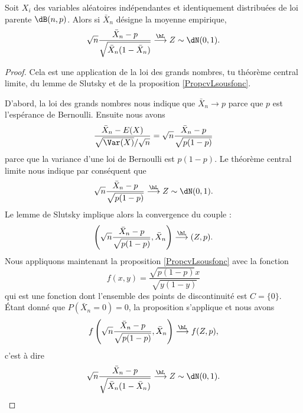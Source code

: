 \begin{proposition}     \label{PropLimxBNpxbxbsqrt}
    Soit \( X_i\) des variables aléatoires indépendantes et identiquement distribuées de loi parente \( \dB(n,p)\). Alors si \( \bar X_n\) désigne la moyenne empirique,
    \begin{equation}
        \sqrt{n}\frac{ \bar X_n-p }{ \sqrt{\bar X_n(1-\bar X_n)} }\stackrel{\hL}{\longrightarrow}Z\sim\dN(0,1).
    \end{equation}
\end{proposition}

\begin{proof}
    Cela est une application de la loi des grands nombres, tu théorème central limite, du lemme de Slutsky et de la proposition \ref{PropcvLsousfonc}.

    D'abord, la loi des grands nombres nous indique que \( \bar X_n\to p\) parce que \( p\) est l'espérance de Bernoulli. Ensuite nous avons
    \begin{equation}
        \frac{ \bar X_n-E(X) }{ \sqrt{\Var(X)}/\sqrt{n} }=\sqrt{n}\frac{ \bar X_n-p }{ \sqrt{p(1-p)} }
    \end{equation}
    parce que la variance d'une loi de Bernoulli est \( p(1-p)\). Le théorème central limite nous indique par conséquent que
    \begin{equation}
        \sqrt{n}\frac{ \bar X_n-p }{ \sqrt{p(1-p)} }\stackrel{\hL}{\longrightarrow}Z\sim\dN(0,1).
    \end{equation}
    Le lemme de Slutsky implique alors la convergence du couple :
    \begin{equation}
        \left( \sqrt{n}\frac{ \bar X_n-p }{ \sqrt{p(1-p)} },\bar X_n \right)\stackrel{\hL}{\longrightarrow}(Z,p).
    \end{equation}
    Nous appliquons maintenant la proposition \ref{PropcvLsousfonc} avec la fonction
    \begin{equation}
        f(x,y)=\frac{ \sqrt{p(1-p)}x }{ \sqrt{y(1-y)} }
    \end{equation}
    qui est une fonction dont l'ensemble des points de discontinuité est \( C=\{ 0 \}\). Étant donné que \( P(\bar X_n=0)=0\), la proposition s'applique et nous avons
    \begin{equation}
        f\left( \sqrt{n}\frac{ \bar X_n-p }{ \sqrt{p(1-p)} },\bar X_n \right)\stackrel{\hL}{\longrightarrow}f(Z,p),
    \end{equation}
    c'est à dire
    \begin{equation}
        \sqrt{n}\frac{ \bar X_n-p }{ \sqrt{\bar X_n(1-\bar X_n)} }\stackrel{\hL}{\longrightarrow}Z\sim\dN(0,1).
    \end{equation}
\end{proof}

